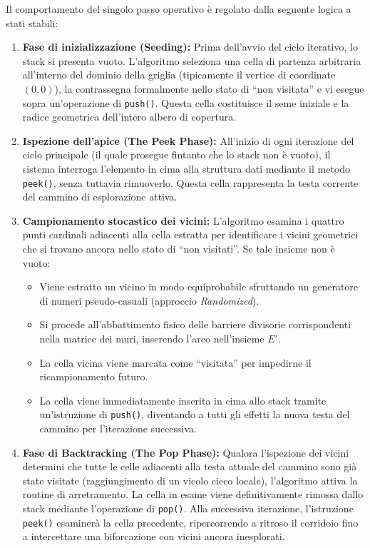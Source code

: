 \documentclass[12pt, a4paper]{article}
\begin{document}
	Il comportamento del singolo passo operativo è regolato dalla seguente logica a stati stabili:
	\begin{enumerate}
		\item \textbf{Fase di inizializzazione (Seeding):} Prima dell'avvio del ciclo iterativo, lo stack si presenta vuoto. L'algoritmo seleziona una cella di partenza arbitraria all'interno del dominio della griglia (tipicamente il vertice di coordinate $(0,0)$), la contrassegna formalmente nello stato di ``non visitata'' e vi esegue sopra un'operazione di \texttt{push()}. Questa cella costituisce il seme iniziale e la radice geometrica dell'intero albero di copertura.
		
		\item \textbf{Ispezione dell'apice (The Peek Phase):} All'inizio di ogni iterazione del ciclo principale (il quale prosegue fintanto che lo stack non è vuoto), il sistema interroga l'elemento in cima alla struttura dati mediante il metodo \texttt{peek()}, senza tuttavia rimuoverlo. Questa cella rappresenta la testa corrente del cammino di esplorazione attiva.
		
		\item \textbf{Campionamento stocastico dei vicini:} L'algoritmo esamina i quattro punti cardinali adiacenti alla cella estratta per identificare i vicini geometrici che si trovano ancora nello stato di ``non visitati''. Se tale insieme non è vuoto:
		\begin{itemize}
			\item Viene estratto un vicino in modo equiprobabile sfruttando un generatore di numeri pseudo-casuali (approccio \textit{Randomized}).
			\item Si procede all'abbattimento fisico delle barriere divisorie corrispondenti nella matrice dei muri, inserendo l'arco nell'insieme $E'$.
			\item La cella vicina viene marcata come ``visitata'' per impedirne il ricampionamento futuro.
			\item La cella viene immediatamente inserita in cima allo stack tramite un'istruzione di \texttt{push()}, diventando a tutti gli effetti la nuova testa del cammino per l'iterazione successiva.
		\end{itemize}
		
		\item \textbf{Fase di Backtracking (The Pop Phase):} Qualora l'ispezione dei vicini determini che tutte le celle adiacenti alla testa attuale del cammino sono già state visitate (raggiungimento di un vicolo cieco locale), l'algoritmo attiva la routine di arretramento. La cella in esame viene definitivamente rimossa dallo stack mediante l'operazione di \texttt{pop()}. Alla successiva iterazione, l'istruzione \texttt{peek()} esaminerà la cella precedente, ripercorrendo a ritroso il corridoio fino a intercettare una biforcazione con vicini ancora inesplorati.
	\end{enumerate}
	
\end{document}
